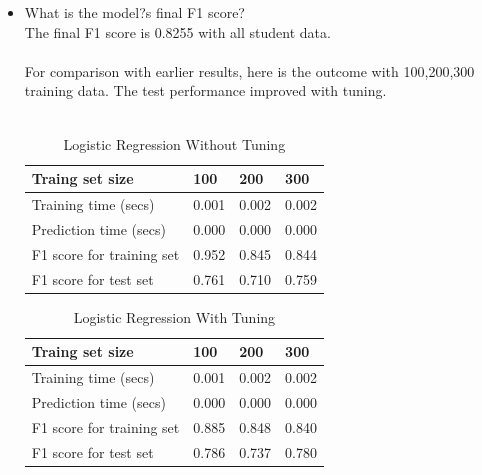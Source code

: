 \documentclass{article}
\begin{document}
\begin{itemize}
\color{black}

\item What is the model?s final F1 score?
\\
\color{blue}
The final F1 score is 0.8255 with all student data.
\\\\
For comparison with earlier results, here is the outcome with 100,200,300 training data.
The test performance improved with tuning.
\\\\
\begin{table}[H]
\centering
\begin{tabular}{| l | l | l | l |}
\hline
Traing set size           & 100 & 200 & 300 \\
\hline
Training time (secs)      & 0.001 & 0.002 & 0.002 \\
\hline
Prediction time (secs)    & 0.000 & 0.000 & 0.000 \\
\hline
F1 score for training set & 0.952 & 0.845 & 0.844 \\
\hline
F1 score for test set     & 0.761 & 0.710 & 0.759 \\
\hline      
\end{tabular}
\caption{Logistic Regression Without Tuning}
\end{table}

\begin{table}[H]
\centering
\begin{tabular}{| l | l | l | l |}
\hline
Traing set size           & 100 & 200 & 300 \\
\hline
Training time (secs)      & 0.001 & 0.002 & 0.002 \\
\hline
Prediction time (secs)    & 0.000 & 0.000 & 0.000 \\
\hline
F1 score for training set & 0.885 & 0.848 & 0.840 \\
\hline
F1 score for test set     & 0.786 & 0.737 & 0.780 \\
\hline      
\end{tabular}
\caption{Logistic Regression With Tuning}
\end{table}

\color{black}
\end{itemize}
\end{document}
